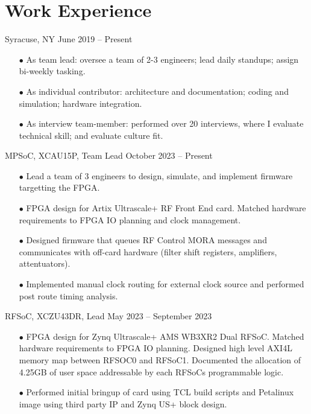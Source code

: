 \documentclass[10pt,final,sans]{resume}
\begin{document}
\vfill

\section{Work Experience}
 { Syracuse, NY } { June 2019 -- Present }
\begin{adjustwidth}{.3cm}{}
\begin{itemize}
  \item[$\bullet$] As team lead: oversee a team of 2-3 engineers; lead daily standups; assign bi-weekly tasking. 
  \item[$\bullet$] As individual contributor: architecture and documentation; coding and simulation; hardware integration. 
  \item[$\bullet$] As interview team-member: performed over 20 interviews, where I evaluate technical skill; and evaluate culture fit. 
\end{itemize}
\end{adjustwidth}

\begin{adjustwidth}{.3cm}{}
   { MPSoC, XCAU15P, Team Lead } { October 2023 -- Present }
  \begin{itemize}
    \item[$\bullet$] Lead a team of 3 engineers to design, simulate, and implement firmware targetting the FPGA.
    \item[$\bullet$] FPGA design for Artix Ultrascale+ RF Front End card. Matched hardware requirements to FPGA IO planning and clock management.
    \item[$\bullet$] Designed firmware that queues RF Control MORA messages and communicates with off-card hardware (filter shift registers, amplifiers, attentuators). 
    \item[$\bullet$] Implemented manual clock routing for external clock source and performed post route timing analysis.
  \end{itemize}
\end{adjustwidth}

\begin{adjustwidth}{.3cm}{}
   { RFSoC, XCZU43DR, Lead } { May 2023 -- September 2023 }
  \begin{itemize}
    \item[$\bullet$] FPGA design for Zynq Ultrascale+ AMS WB3XR2 Dual RFSoC. Matched hardware requirements to FPGA IO planning. Designed high level AXI4L memory map between RFSOC0 and RFSoC1. Documented the allocation of 4.25GB of user space addressable by each RFSoCs programmable logic.
    \item[$\bullet$] Performed initial bringup of card using TCL build scripts and Petalinux image using third party IP and Zynq US+ block design.
  \end{itemize}
\end{adjustwidth}
\end{document}
